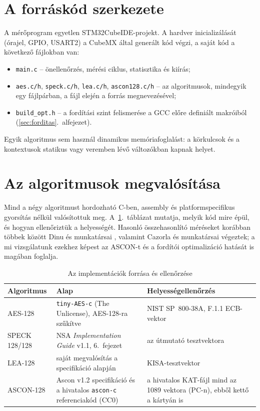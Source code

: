 \documentclass[a4paper,12pt]{report}
\theoremstyle{definition}
\theoremstyle{remark}
\begin{document}
\section{A forráskód szerkezete}

A mérőprogram egyetlen STM32CubeIDE-projekt. A hardver inicializálását (órajel, GPIO, USART2) a CubeMX által generált kód végzi, a saját kód a következő fájlokban van:

\begin{itemize}
	\item \texttt{main.c} -- önellenőrzés, mérési ciklus, statisztika és kiírás;
	\item \texttt{aes.c/h}, \texttt{speck.c/h}, \texttt{lea.c/h}, \texttt{ascon128.c/h} -- az algoritmusok, mindegyik egy fájlpárban, a fájl elején a forrás megnevezésével;
	\item \texttt{build\_opt.h} -- a fordítási szint felismerése a GCC előre definiált makróiból (\ref{sec:forditas}.~alfejezet).
\end{itemize}

Egyik algoritmus sem használ dinamikus memóriafoglalást: a körkulcsok és a kontextusok statikus vagy veremben lévő változókban kapnak helyet.

\section{Az algoritmusok megvalósítása}\label{sec:megvalositas}

Mind a négy algoritmust hordozható C-ben, assembly és platformspecifikus gyorsítás nélkül valósítottuk meg. A~\ref{tab:forrasok}.~táblázat mutatja, melyik kód mire épül, és hogyan ellenőriztük a helyességét. Hasonló összehasonlító méréseket korábban többek között Dinu és munkatársai \cite{Dinu2015}, valamint Cazorla és munkatársai \cite{Cazorla2013} végeztek; a mi vizsgálatunk ezekhez képest az ASCON-t és a fordítói optimalizáció hatását is magában foglalja.

\begin{table}[htbp]
    \centering
    \small
    \caption{Az implementációk forrása és ellenőrzése}
    \label{tab:forrasok}
    \begin{tabularx}{\textwidth}{|l|X|X|}
        \hline
        \textbf{Algoritmus} & \textbf{Alap} & \textbf{Helyességellenőrzés} \\ \hline
        AES-128 & \texttt{tiny-AES-c} \cite{TinyAES} (The Unlicense), AES-128-ra szűkítve & NIST SP~800-38A, F.1.1 ECB-vektor \cite{SP80038A} \\ \hline
        SPECK 128/128 & NSA \emph{Implementation Guide} v1.1, 6.~fejezet \cite{Beaulieu2019} & az útmutató tesztvektora \\ \hline
        LEA-128 & saját megvalósítás a specifikáció alapján \cite{Hong2013,Lee2014} & KISA-tesztvektor \cite{KISALEA} \\ \hline
        ASCON-128 & Ascon v1.2 specifikáció \cite{Dobraunig2021} és a hivatalos \texttt{ascon-c} referenciakód \cite{AsconC} (CC0) & a hivatalos KAT-fájl mind az 1089 vektora (PC-n), ebből kettő a kártyán is \\ \hline
    \end{tabularx}
\end{table}
\end{document}
